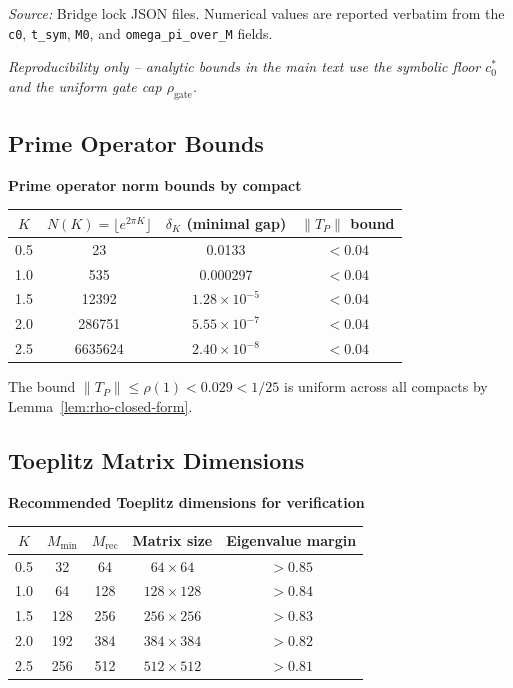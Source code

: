 \noindent\emph{Source:} Bridge lock JSON files. Numerical values are reported verbatim from the \texttt{c0}, \texttt{t\_sym}, \texttt{M0}, and \texttt{omega\_pi\_over\_M} fields.

\begin{center}
\footnotesize\itshape Reproducibility only -- analytic bounds in the main text use the symbolic floor $c_0^*$ and the uniform gate cap $\rho_{\mathrm{gate}}$.
\end{center}

\subsection{Prime Operator Bounds}\label{ptab:prime}

\begin{center}
\textbf{Prime operator norm bounds by compact}
\end{center}

\begin{center}
\begin{tabular}{cccc}
\toprule
$K$ & $N(K) = \lfloor e^{2\pi K}\rfloor$ & $\delta_K$ (minimal gap) & $\|T_P\|$ bound \\
\midrule
0.5 & 23 & 0.0133 & $< 0.04$ \\
1.0 & 535 & 0.000297 & $< 0.04$ \\
1.5 & 12392 & $1.28 \times 10^{-5}$ & $< 0.04$ \\
2.0 & 286751 & $5.55 \times 10^{-7}$ & $< 0.04$ \\
2.5 & 6635624 & $2.40 \times 10^{-8}$ & $< 0.04$ \\
\bottomrule
\end{tabular}
\end{center}

\noindent The bound $\|T_P\| \le \rho(1) < 0.029 < 1/25$ is uniform across all compacts by Lemma~\ref{lem:rho-closed-form}.

\subsection{Toeplitz Matrix Dimensions}\label{ptab:toeplitz}

\begin{center}
\textbf{Recommended Toeplitz dimensions for verification}
\end{center}

\begin{center}
\begin{tabular}{ccccc}
\toprule
$K$ & $M_{\min}$ & $M_{\mathrm{rec}}$ & Matrix size & Eigenvalue margin \\
\midrule
0.5 & 32 & 64 & $64 \times 64$ & $> 0.85$ \\
1.0 & 64 & 128 & $128 \times 128$ & $> 0.84$ \\
1.5 & 128 & 256 & $256 \times 256$ & $> 0.83$ \\
2.0 & 192 & 384 & $384 \times 384$ & $> 0.82$ \\
2.5 & 256 & 512 & $512 \times 512$ & $> 0.81$ \\
\bottomrule
\end{tabular}
\end{center}

